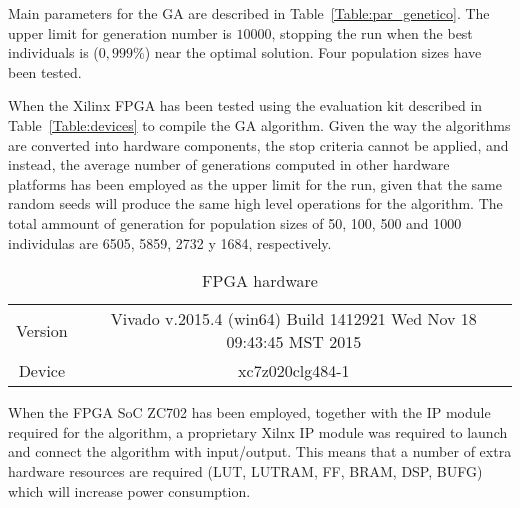 
Main parameters for the GA are described in Table~\ref{Table:par_genetico}.  The upper limit for generation number is  $10000$, stopping the run when the best individuals is ($0,999\%$) near the optimal solution. Four population sizes have been tested.

When the Xilinx FPGA has been tested using the evaluation kit described in Table~\ref{Table:devices} to compile the GA algorithm. Given the way the algorithms are converted into hardware components, the stop criteria cannot be applied, and instead, the average number of generations computed in other hardware platforms has been employed as the upper limit for the run, given that the same random seeds will produce the same high level operations for the algorithm.  The total ammount of generation for population sizes of 50, 100, 500 and 1000 individulas are  6505, 5859, 2732 y 1684, respectively.



\begin{table}
\renewcommand{\arraystretch}{1.3}
\centering
\caption{FPGA hardware}
\label{Table:fpga}
\begin{tabular}{cc} \hline
  Version & Vivado v.2015.4 (win64) Build 1412921 Wed Nov 18 09:43:45 MST 2015 \\ 
  Device & xc7z020clg484-1\\
\hline
\end{tabular}
\end{table}

When the FPGA SoC ZC702 has been employed, together with the IP module required for the algorithm, a proprietary Xilnx IP module was required to launch and connect the algorithm with input/output.  This means that a number of extra hardware resources are required (LUT, LUTRAM, FF, BRAM, DSP, BUFG) which will increase power consumption.  


